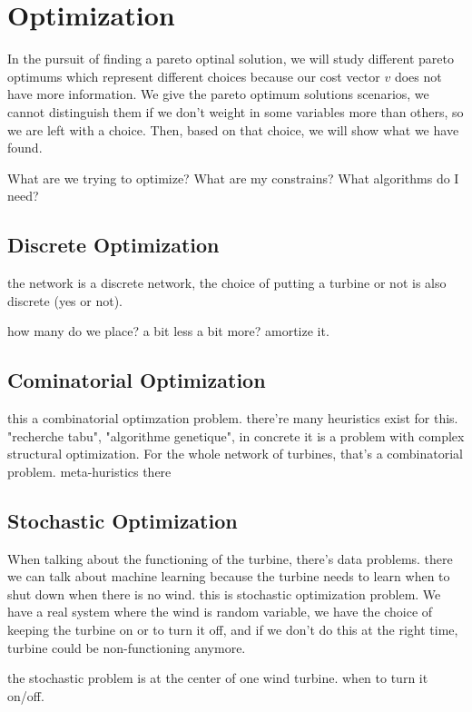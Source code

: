 \documentclass[12pt]{article}
\begin{document}
\section{Optimization}
In the pursuit of finding a pareto optinal solution, we will study different pareto optimums which represent different choices because our cost vector  $v$ does not have more information. We give the pareto optimum solutions scenarios, we cannot distinguish them if we don't weight in some variables more than others, so we are left with a choice. Then, based on that choice, we will show what we have found. 

What are we trying to optimize? What are my constrains? What algorithms do I need?

\subsection{Discrete Optimization}
the network is a discrete network, the choice of putting a turbine or not is also
discrete (yes or not). 

how many do we place? a bit less a bit more? amortize it.

\subsection{Cominatorial Optimization}
this a combinatorial optimzation problem. there're many heuristics exist for this. 
"recherche tabu", "algorithme genetique", in concrete it is a problem with complex
structural optimization. 
For the whole network of turbines, that's a combinatorial problem. meta-huristics there


\subsection{Stochastic Optimization}
When talking about the functioning of the turbine, there's data problems.
there we can talk about machine learning because the turbine needs to learn when to shut down when there is no wind. this is stochastic optimization problem. We have a real 
system where the wind is random variable, we have the choice of keeping the turbine on or to turn it off, and if we don't do this at the right time, turbine could be non-functioning anymore. 

the stochastic problem is at the center of one wind turbine. when to turn it on/off.
\end{document}
